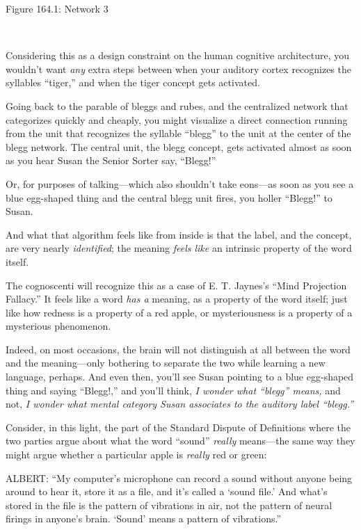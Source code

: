 {\centering
{}
 \newline
 Figure 164.1: Network 3
\par}


\bigskip

{
 ~}

{
 Considering this as a design constraint on the human cognitive
architecture, you wouldn't want \textit{any} extra
steps between when your auditory cortex recognizes the syllables
``tiger,'' and when the tiger
concept gets activated.}

{
 Going back to the parable of bleggs and rubes, and the centralized
network that categorizes quickly and cheaply, you might visualize a
direct connection running from the unit that recognizes the syllable
``blegg'' to the unit at the center
of the blegg network. The central unit, the blegg concept, gets
activated almost as soon as you hear Susan the Senior Sorter say,
``Blegg!''}

{
 Or, for purposes of talking---which also shouldn't
take eons---as soon as you see a blue egg-shaped thing and the central
blegg unit fires, you holler
``Blegg!'' to Susan.}

{
 And what that algorithm feels like from inside is that the label,
and the concept, are very nearly \textit{identified}; the meaning
\textit{feels like} an intrinsic property of the word itself.}

{
 The cognoscenti will recognize this as a case of E. T.
Jaynes's ``Mind Projection
Fallacy.'' It feels like a word \textit{has a}
meaning, as a property of the word itself; just like how redness is a
property of a red apple, or mysteriousness is a property of a
mysterious phenomenon.}

{
 Indeed, on most occasions, the brain will not distinguish at all
between the word and the meaning---only bothering to separate the two
while learning a new language, perhaps. And even then,
you'll see Susan pointing to a blue egg-shaped thing
and saying ``Blegg!,'' and
you'll think, \textit{I wonder what
``blegg'' means,} and not, \textit{I
wonder what mental category Susan associates to the auditory label
``blegg.''}}

{
 Consider, in this light, the part of the Standard Dispute of
Definitions where the two parties argue about what the word
``sound'' \textit{really}
means---the same way they might argue whether a particular apple is
\textit{really} red or green:}

{
 ALBERT: ``My computer's
microphone can record a sound without anyone being around to hear it,
store it as a file, and it's called a
`sound file.' And what's
stored in the file is the pattern of vibrations in air, not the pattern
of neural firings in anyone's brain.
`Sound' means a pattern of
vibrations.''}

